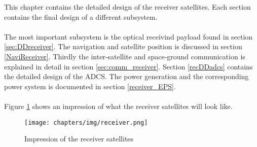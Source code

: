 This chapter contains the detailed design of the receiver satellites. Each section contains the final design of a different subsystem. 
\\\\
The most important subsystem is the optical receivind payload found in section \ref{sec:DDreceiver}. The navigation and satellite position is discussed in section \ref{NaviReceiver}. Thirdly the inter-satellite and space-ground communication is explained in detail in section \ref{sec:comm_receiver}. Section \ref{recDDadcs} contains the detailed design of the \ac{ADCS}. The power generation and the corresponding power system is documented in section \ref{receiver_EPS}. 
\\\\
Figure \ref{fig:receiverSat} shows an impression of what the receiver satellites will look like.

\begin{figure}
\texttt{[image: chapters/img/receiver.png]}
\caption{Impression of the receiver satellites}
\label{fig:receiverSat}
\end{figure}